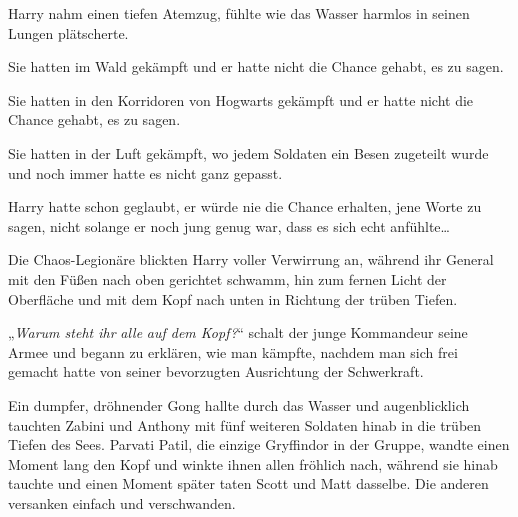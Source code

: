 Harry nahm einen tiefen Atemzug, fühlte wie das Wasser harmlos in seinen Lungen plätscherte.

Sie hatten im Wald gekämpft und er hatte nicht die Chance gehabt, es zu sagen.

Sie hatten in den Korridoren von Hogwarts gekämpft und er hatte nicht die Chance gehabt, es zu sagen.

Sie hatten in der Luft gekämpft, wo jedem Soldaten ein Besen zugeteilt wurde und noch immer hatte es nicht ganz gepasst.

Harry hatte schon geglaubt, er würde nie die Chance erhalten, jene Worte zu sagen, nicht solange er noch jung genug war, dass es sich echt anfühlte…

Die Chaos-Legionäre blickten Harry voller Verwirrung an, während ihr General mit den Füßen nach oben gerichtet schwamm, hin zum fernen Licht der Oberfläche und mit dem Kopf nach unten in Richtung der trüben Tiefen.

„\emph{Warum steht ihr} \emph{alle} \emph{auf dem Kopf?}“ schalt der junge Kommandeur seine Armee und begann zu erklären, wie man kämpfte, nachdem man sich frei gemacht hatte von seiner bevorzugten Ausrichtung der Schwerkraft.

\later

Ein dumpfer, dröhnender Gong hallte durch das Wasser und augenblicklich tauchten Zabini und Anthony mit fünf weiteren Soldaten hinab in die trüben Tiefen des Sees. Parvati Patil, die einzige Gryffindor in der Gruppe, wandte einen Moment lang den Kopf und winkte ihnen allen fröhlich nach, während sie hinab tauchte und einen Moment später taten Scott und Matt dasselbe. Die anderen versanken einfach und verschwanden.

